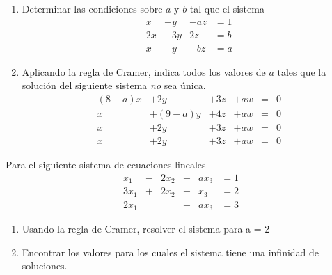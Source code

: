 \documentclass[
]{article}
\begin{document}
\begin{enumerate}
\def\labelenumi{\arabic{enumi}.}
\setcounter{enumi}{2}
\item
  Determinar las condiciones sobre \(a\) y \(b\) tal que el sistema
  \begin{equation*}
    \begin{array}{cccc}
    x   & + y   & -a z    &= 1  \\
    2 x & +3 y  & 2z      & = b\\
    x   & -y    & +bz     & =a
    \end{array}
  \end{equation*}
\item
  Aplicando la regla de Cramer, indica todos los valores de \(a\) tales
  que la solución del siguiente sistema \emph{no} sea única.
  \begin{equation*}
  \begin{array}{cccccc}
  (8-a)x & +2y      & +3z & +aw  & = & 0 \\
    x & +(9-a)y  & +4z & + aw & = & 0 \\
    x & +2y      & +3z & + aw & = & 0 \\
    x & +2y      & +3z & + aw & = & 0
  \end{array}
  \end{equation*}
\end{enumerate}

Para el siguiente sistema de ecuaciones lineales \begin{equation*}
  \begin{array}{cccccc}
       x_1 & -  & 2x_2 & +  &  ax_3    & = 1  \\
     3 x_1 & +  & 2x_2 & +  &  x_3    & = 2\\
     2 x_1 &    &      &  + &  ax_3    & = 3
  \end{array}
\end{equation*}

\begin{enumerate}
\def\labelenumi{\alph{enumi})}
\item
  Usando la regla de Cramer, resolver el sistema para a = 2
\item
  Encontrar los valores para los cuales el sistema tiene una infinidad
  de soluciones.
\end{enumerate}
\end{document}
